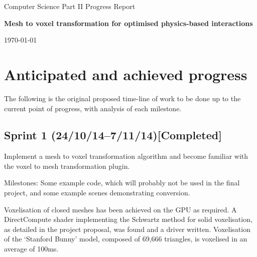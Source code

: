 \documentclass[a4 paper,12pt]{article}
\begin{document}
\thispagestyle{empty}

\begin{minipage}[t]{0.5\textwidth}
\medskip
{}
\medskip
{}
\end{minipage}
\begin{minipage}[t]{0.5\textwidth}
\medskip
{}
\medskip
\medskip
{}
\medskip
{}
\medskip
\medskip
{}
\medskip
{}
\end{minipage}

\vfil
\centerline{\large Computer Science Part II Progress Report}
\vspace{0.4in}
\begin{center}
\Large\bf{Mesh to voxel transformation for optimised physics-based interactions}
\end{center}
\vspace{0.3in}
\centerline{\large \today}

\vfil

\eject

\section{Anticipated and achieved progress}

The following is the original proposed time-line of work to be done up to the current point of progress, with analysis of each milestone.

\subsection*{Sprint 1 (24/10/14--7/11/14)[Completed]}

{\it{Implement a mesh to voxel transformation algorithm and become familiar with the voxel to mesh transformation plugin.

Milestones: Some example code, which will probably not be
used in the final project, and some example scenes demonstrating conversion.}}

Voxelisation of closed meshes has been achieved on the GPU as required. A {} DirectCompute shader implementing the Schwartz method for solid voxelisation, as detailed in the project proposal, was found and a {} driver written. Voxelisation of the `Stanford Bunny' model, composed of 69,666 triangles, is voxelised in an average of 100ms.
\end{document}
